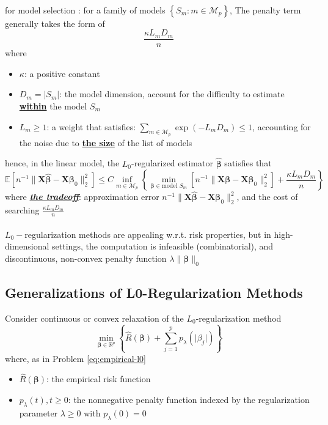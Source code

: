 \documentclass[twoside]{article}
\begin{document}
\paragraph*{}
for model selection \citep{barron1999risk}: for a family of models $\left\{ S_m: m\in\mathcal{M}_p \right\}$, The penalty term generally takes the form of $$ \frac{\kappa L_m D_m}{n} $$ where 
    \begin{itemize}
        \item $\kappa$: a positive constant
        \item $D_m = \lvert S_m \rvert$: the model dimension, account for the difficulty to estimate \textbf{\underline{within}} the model $S_m$
        \item $L_m\geq 1$: a weight that satisfies: $\sum_{m\in \mathcal{M}_p}\exp(-L_mD_m)\leq 1$, accounting for the noise due to \textbf{\underline{the size}} of the list of models
    \end{itemize}
hence, in the linear model, the $L_0$-regularized estimator $\hat{\boldsymbol{\beta}}$ satisfies that 
$$
\mathbb{E}\left[ n^{-1}\lVert \mathbf{X}\hat{\boldsymbol{\beta}}- \mathbf{X}{\boldsymbol{\beta}}_0 \rVert^2_2 \right] \leq C \inf_{m\in \mathcal{M}_p}\left\{ \min_{\boldsymbol{\beta}\in\text{model }S_m} \left[ n^{-1}\lVert \mathbf{X}{\boldsymbol{\beta}}- \mathbf{X}{\boldsymbol{\beta}}_0 \rVert^2_2 \right] + \frac{\kappa L_m D_m}{n}\right\}
$$
where \textit{\underline{\textbf{the tradeoff}}}: approximation error $ n^{-1}\lVert \mathbf{X}\hat{\boldsymbol{\beta}}- \mathbf{X}{\boldsymbol{\beta}}_0 \rVert^2_2 $, and the cost of searching $\frac{\kappa L_m D_m}{n}$

\paragraph*{} $L_0-$regularization methods are appealing w.r.t. risk properties, but in high-dimensional settings, the computation is infeasible (combinatorial), and discontinuous, non-convex penalty function $\lambda \lVert \boldsymbol{\beta}\rVert _0$

\subsection{Generalizations of L0-Regularization Methods}
Consider continuous or convex relaxation of the $L_0$-regularization method 
\begin{equation}\label{eq:relaxed-l0}
    \min_{\boldsymbol{\beta}\in\mathbb{R}^p} \left\{ \hat{R}(\boldsymbol{\beta}) + \sum^p_{j=1}p_{\lambda}\left(\lvert \beta_j \rvert\right) \right\}
\end{equation}
where, as in Problem \ref{eq:empirical-l0}
\begin{itemize}
    \item $\hat{R}(\boldsymbol{\beta})$: the empirical risk function 
    \item $p_{\lambda}(t),t\geq 0$: the nonnegative penalty function indexed by the regularization parameter $\lambda \geq 0$ with $p_{\lambda}(0)=0$
\end{itemize}
\end{document}
